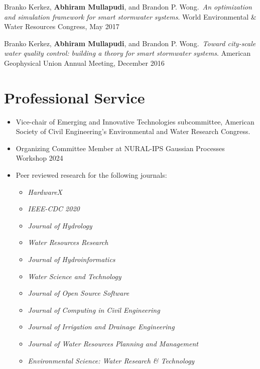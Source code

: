 \documentclass[a4paper,11pt]{article}
\newcommand{\years}[1]{%
  {\reversemarginpar\strut\marginnote{{\small#1}}}%
}
\begin{document}
\years{2017} Branko Kerkez, \textbf{Abhiram Mullapudi}, and Brandon P. Wong.\ \emph{An optimization and simulation framework for smart stormwater systems}. World Environmental \& Water Resources Congress, May 2017\\[.1cm]

\years{2016} Branko Kerkez, \textbf{Abhiram Mullapudi}, and Brandon P. Wong.\ \emph{Toward city-scale water quality control: building a theory for smart stormwater systems}. American Geophysical Union Annual Meeting, December 2016

\section*{Professional Service}

\begin{itemize}
	\item Vice-chair of Emerging and Innovative Technologies subcommittee, American Society of Civil Engineering's Environmental and Water Research Congress. 
	\item Organizing Committee Member at NURAL-IPS Gaussian Processes Workshop 2024
	\item Peer reviewed research for the following journals:
	\begin{itemize}
		\item \textit{HardwareX}
		\item \textit{IEEE-CDC 2020}
		\item \textit{Journal of Hydrology}
		\item \textit{Water Resources Research}
		\item \textit{Journal of Hydroinformatics}
		\item \textit{Water Science and Technology}
		\item \textit{Journal of Open Source Software}
		\item \textit{Journal of Computing in Civil Engineering}
		\item \textit{Journal of Irrigation and Drainage Engineering}
		\item \textit{Journal of Water Resources Planning and Management}
		\item \textit{Environmental Science: Water Research \& Technology}
	\end{itemize}
\end{itemize}
\end{document}
